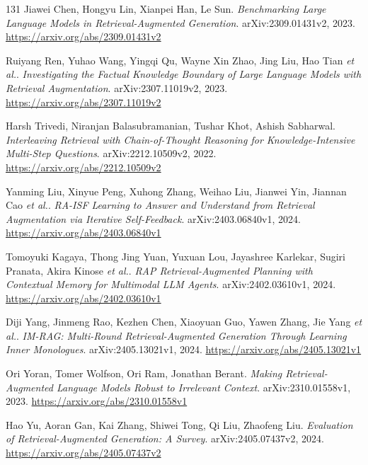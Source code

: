 \documentclass[11pt,a4paper]{article}
\begin{document}
\begin{thebibliography}{131}
Jiawei Chen, Hongyu Lin, Xianpei Han, Le Sun.
\newblock \emph{Benchmarking Large Language Models in Retrieval-Augmented Generation}.
\newblock arXiv:2309.01431v2, 2023.
\newblock \url{https://arxiv.org/abs/2309.01431v2}

Ruiyang Ren, Yuhao Wang, Yingqi Qu, Wayne Xin Zhao, Jing Liu, Hao Tian \emph{et al.}.
\newblock \emph{Investigating the Factual Knowledge Boundary of Large Language Models with Retrieval Augmentation}.
\newblock arXiv:2307.11019v2, 2023.
\newblock \url{https://arxiv.org/abs/2307.11019v2}

Harsh Trivedi, Niranjan Balasubramanian, Tushar Khot, Ashish Sabharwal.
\newblock \emph{Interleaving Retrieval with Chain-of-Thought Reasoning for Knowledge-Intensive Multi-Step Questions}.
\newblock arXiv:2212.10509v2, 2022.
\newblock \url{https://arxiv.org/abs/2212.10509v2}

Yanming Liu, Xinyue Peng, Xuhong Zhang, Weihao Liu, Jianwei Yin, Jiannan Cao \emph{et al.}.
\newblock \emph{RA-ISF Learning to Answer and Understand from Retrieval Augmentation via Iterative Self-Feedback}.
\newblock arXiv:2403.06840v1, 2024.
\newblock \url{https://arxiv.org/abs/2403.06840v1}

Tomoyuki Kagaya, Thong Jing Yuan, Yuxuan Lou, Jayashree Karlekar, Sugiri Pranata, Akira Kinose \emph{et al.}.
\newblock \emph{RAP Retrieval-Augmented Planning with Contextual Memory for Multimodal LLM Agents}.
\newblock arXiv:2402.03610v1, 2024.
\newblock \url{https://arxiv.org/abs/2402.03610v1}

Diji Yang, Jinmeng Rao, Kezhen Chen, Xiaoyuan Guo, Yawen Zhang, Jie Yang \emph{et al.}.
\newblock \emph{IM-RAG: Multi-Round Retrieval-Augmented Generation Through Learning Inner Monologues}.
\newblock arXiv:2405.13021v1, 2024.
\newblock \url{https://arxiv.org/abs/2405.13021v1}

Ori Yoran, Tomer Wolfson, Ori Ram, Jonathan Berant.
\newblock \emph{Making Retrieval-Augmented Language Models Robust to Irrelevant Context}.
\newblock arXiv:2310.01558v1, 2023.
\newblock \url{https://arxiv.org/abs/2310.01558v1}

Hao Yu, Aoran Gan, Kai Zhang, Shiwei Tong, Qi Liu, Zhaofeng Liu.
\newblock \emph{Evaluation of Retrieval-Augmented Generation: A Survey}.
\newblock arXiv:2405.07437v2, 2024.
\newblock \url{https://arxiv.org/abs/2405.07437v2}


\end{thebibliography}
\end{document}
